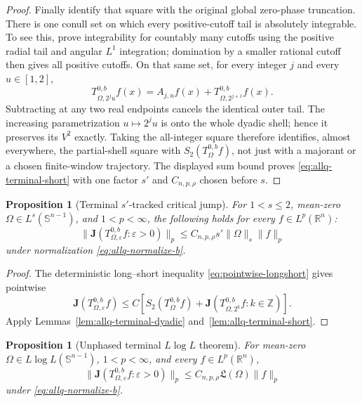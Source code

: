 \documentclass[11pt]{article}
\numberwithin{equation}{section}
\newtheorem{proposition}[theorem]{Proposition}
\theoremstyle{remark}
\theoremstyle{definition}
\newcommand{\R}{\mathbb R}
\newcommand{\Sph}{\mathbb S}
\begin{document}
\begin{proof}
Finally identify that square with the original global zero-phase
truncation.  There is one conull set on which every positive-cutoff
tail is absolutely integrable.  To see this, prove integrability for
countably many cutoffs using the positive radial tail and angular
$L^1$ integration; domination by a smaller rational cutoff then gives
all positive cutoffs.  On that same set, for every integer $j$ and
every $u\in[1,2]$,
\[
 T^{0,b}_{\Omega,2^ju}f(x)
 =A_{j,u}f(x)+T^{0,b}_{\Omega,2^{j+1}}f(x).
\]
Subtracting at any two real endpoints cancels the identical outer
tail.  The increasing parametrization $u\mapsto2^ju$ is onto the
whole dyadic shell; hence it preserves its $V^2$ exactly.
Taking the all-integer square therefore identifies, almost everywhere,
the partial-shell square with $S_2(T^{0,b}_\Omega f)$, not just with a
majorant or a chosen finite-window trajectory.  The displayed sum
bound proves \eqref{eq:allq-terminal-short} with one factor $s'$ and
$C_{n,p,\rho}$ chosen before $s$.
\end{proof}

\begin{proposition}[Terminal $s'$-tracked critical jump]
\label{prop:allq-terminal-sp}
For $1<s\le2$, mean-zero $\Omega\in L^s(\Sph^{n-1})$, and
$1<p<\infty$, the following holds for every $f\in L^p(\R^n)$:
\begin{equation}\label{eq:allq-terminal-sp}
 \|\mathbf J(T^{0,b}_{\Omega,\varepsilon}f:\varepsilon>0)\|_p
 \le C_{n,p,\rho}s'\|\Omega\|_s\|f\|_p
\end{equation}
under normalization \eqref{eq:allq-normalize-b}.
\end{proposition}

\begin{proof}
The deterministic long--short inequality
\eqref{eq:pointwise-longshort} gives pointwise
\[
 \mathbf J(T^{0,b}_{\Omega,\varepsilon}f)
 \le C\left[
 S_2(T^{0,b}_\Omega f)+
 \mathbf J(T^{0,b}_{\Omega,2^k}f:k\in\mathbb Z)
 \right].
\]
Apply Lemmas~\ref{lem:allq-terminal-dyadic}
and~\ref{lem:allq-terminal-short}.
\end{proof}

\begin{proposition}[Unphased terminal $L\log L$ theorem]
\label{prop:allq-terminal-LlogL}
For mean-zero $\Omega\in L\log L(\Sph^{n-1})$, $1<p<\infty$, and every
$f\in L^p(\R^n)$,
\begin{equation}\label{eq:allq-terminal-LlogL}
 \|\mathbf J(T^{0,b}_{\Omega,\varepsilon}f:\varepsilon>0)\|_p
 \le C_{n,p,\rho}\mathfrak L(\Omega)\|f\|_p
\end{equation}
under \eqref{eq:allq-normalize-b}.
\end{proposition}
\end{document}
